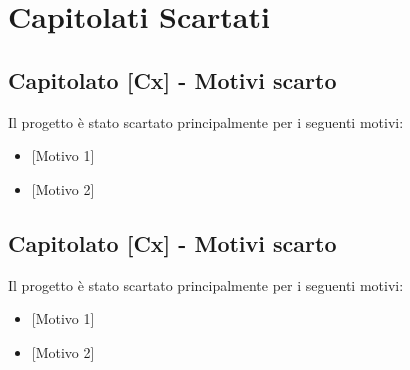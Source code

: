 \section{Capitolati Scartati}

\subsection{Capitolato {[Cx]} - Motivi scarto}
Il progetto è stato scartato principalmente per i seguenti motivi:
\begin{itemize}
	\item {[Motivo 1]}
	\item {[Motivo 2]}
\end{itemize}

\subsection{Capitolato {[Cx]} - Motivi scarto}
Il progetto è stato scartato principalmente per i seguenti motivi:
\begin{itemize}
	\item {[Motivo 1]}
	\item {[Motivo 2]}
\end{itemize}